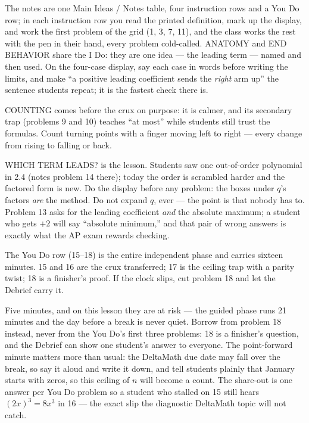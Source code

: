 \documentclass[10pt]{article}
\begin{document}
\begin{teachernote}
The notes are one Main Ideas / Notes table, four instruction rows and a You Do row; in each
instruction row you read the printed definition, mark up the display, and work the first
problem of the grid (1, 3, 7, 11), and the class works the rest with the pen in their hand,
every problem cold-called. ANATOMY and END BEHAVIOR share the I Do: they are one idea --- the
leading term --- named and then used. On the four-case display, say each case in words before
writing the limits, and make ``a positive leading coefficient sends the \emph{right} arm up''
the sentence students repeat; it is the fastest check there is.

COUNTING comes before the crux on purpose: it is calmer, and its secondary trap (problems 9
and 10) teaches ``at most'' while students still trust the formulas. Count turning points with
a finger moving left to right --- every change from rising to falling or back.

WHICH TERM LEADS? is the lesson. Students saw one out-of-order polynomial in 2.4 (notes
problem 14 there); today the order is scrambled harder and the factored form is new. Do the
display before any problem: the boxes under $q$'s factors \emph{are} the method. Do not expand
$q$, ever --- the point is that nobody has to. Problem 13 asks for the leading coefficient
\emph{and} the absolute maximum; a student who gets $+2$ will say ``absolute minimum,'' and
that pair of wrong answers is exactly what the AP exam rewards checking.

The You Do row (15--18) is the entire independent phase and carries sixteen minutes. 15 and
16 are the crux transferred; 17 is the ceiling trap with a parity twist; 18 is a finisher's
proof. If the clock slips, cut problem 18 and let the Debrief carry it.
\end{teachernote}

\begin{teachernote}[Debrief]
Five minutes, and on this lesson they are at risk --- the guided phase runs 21 minutes and the
day before a break is never quiet. Borrow from problem 18 instead, never from the You Do's first
three problems: 18 is a finisher's question, and the Debrief can show one student's answer to
everyone. The point-forward minute matters more than usual: the DeltaMath due date may fall
over the break, so say it aloud and write it down, and tell students plainly that January
starts with zeros, so this ceiling of $n$ will become a count. The share-out is one answer per
You Do problem so a student who stalled on 15 still hears $(2x)^3 = 8x^3$ in 16 --- the exact
slip the diagnostic DeltaMath topic will not catch.
\end{teachernote}
\end{document}
